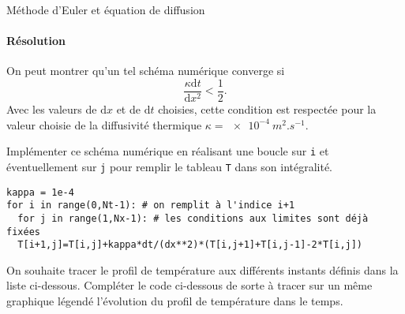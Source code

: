 \begin{exo}[1][python]{Méthode d'Euler et équation de diffusion}
      \paragraph{Résolution}
      On peut montrer qu'un tel schéma numérique converge si $$\frac{\kappa \mathrm{d} t}{\mathrm{d} x^2}<\frac{1}{2}.$$ Avec les valeurs de $\mathrm{d} x$ et de $\mathrm{d} t$ choisies, cette condition est respectée pour la valeur choisie de la diffusivité thermique $\kappa=\SI{e-4}{m^2.s^{-1}}$.
      \begin{questions}
        \item	Implémenter ce schéma numérique en réalisant une boucle sur \texttt{i} et éventuellement sur \texttt{j} pour remplir le tableau \texttt{T} dans son intégralité.
\begin{verbatim}
kappa = 1e-4
for i in range(0,Nt-1): # on remplit à l'indice i+1
  for j in range(1,Nx-1): # les conditions aux limites sont déjà fixées
  T[i+1,j]=T[i,j]+kappa*dt/(dx**2)*(T[i,j+1]+T[i,j-1]-2*T[i,j])
\end{verbatim}
        \item On souhaite tracer le profil de température aux différents instants définis dans la liste ci-dessous. Compléter le code ci-dessous de sorte à tracer sur un même graphique légendé l'évolution du profil de température dans le temps.
    
        
      \end{questions}
    \end{exo}
